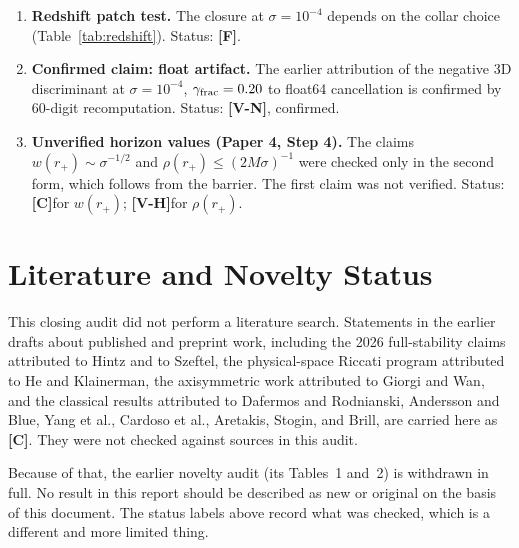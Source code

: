 \documentclass[11pt, a4paper]{article}
\newcommand{\VN}{\textcolor{vn}{\textbf{[V-N]}}}
\newcommand{\VH}{\textcolor{vh}{\textbf{[V-H]}}}
\newcommand{\CC}{\textcolor{cc}{\textbf{[C]}}}
\newcommand{\FF}{\textcolor{ff}{\textbf{[F]}}}
\theoremstyle{remark}
\theoremstyle{definition}
\begin{document}
\begin{enumerate}[leftmargin=*, label=E\arabic*.]
\item \textbf{Redshift patch test.} The closure at $\sigma = 10^{-4}$ depends on the collar choice (Table~\ref{tab:redshift}). Status: \FF.
\item \textbf{Confirmed claim: float artifact.} The earlier attribution of the negative $3$D discriminant at $\sigma=10^{-4}$, $\gamma_{\rm frac}=0.20$ to float64 cancellation is confirmed by 60-digit recomputation. Status: \VN, confirmed.
\item \textbf{Unverified horizon values (Paper 4, Step 4).} The claims $w(r_+)\sim\sigma^{-1/2}$ and $\rho(r_+)\le(2M\sigma)^{-1}$ were checked only in the second form, which follows from the barrier. The first claim was not verified. Status: \CC for $w(r_+)$; \VH for $\rho(r_+)$.
\end{enumerate}

\section{Literature and Novelty Status}
\label{sec:lit}

This closing audit did not perform a literature search. Statements in the earlier drafts about published and preprint work, including the 2026 full-stability claims attributed to Hintz and to Szeftel, the physical-space Riccati program attributed to He and Klainerman, the axisymmetric work attributed to Giorgi and Wan, and the classical results attributed to Dafermos and Rodnianski, Andersson and Blue, Yang et al., Cardoso et al., Aretakis, Stogin, and Brill, are carried here as \CC. They were not checked against sources in this audit.

Because of that, the earlier novelty audit (its Tables~1 and~2) is withdrawn in full. No result in this report should be described as new or original on the basis of this document. The status labels above record what was checked, which is a different and more limited thing.
\end{document}
